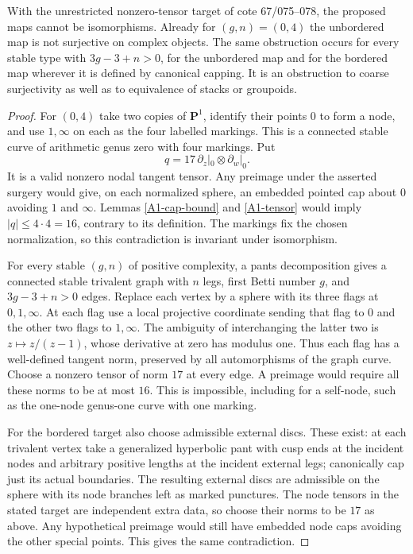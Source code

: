 \begin{theorem}\label{A1-global-refutation}
With the unrestricted nonzero-tensor target of cote 67/075--078, the proposed maps cannot be isomorphisms. Already for $(g,n)=(0,4)$ the unbordered map is not surjective on complex objects. The same obstruction occurs for every stable type with $3g-3+n>0$, for the unbordered map and for the bordered map wherever it is defined by canonical capping. It is an obstruction to coarse surjectivity as well as to equivalence of stacks or groupoids.
\end{theorem}
\begin{proof}
For $(0,4)$ take two copies of $\mathbf P^1$, identify their points $0$ to form a node, and use $1,\infty$ on each as the four labelled markings. This is a connected stable curve of arithmetic genus zero with four markings. Put
\[
q=17\,\partial_z|_0\otimes\partial_w|_0.
\]
It is a valid nonzero nodal tangent tensor. Any preimage under the asserted surgery would give, on each normalized sphere, an embedded pointed cap about $0$ avoiding $1$ and $\infty$. Lemmas \ref{A1-cap-bound} and \ref{A1-tensor} would imply $|q|\leq4\cdot4=16$, contrary to its definition. The markings fix the chosen normalization, so this contradiction is invariant under isomorphism.

For every stable $(g,n)$ of positive complexity, a pants decomposition gives a connected stable trivalent graph with $n$ legs, first Betti number $g$, and $3g-3+n>0$ edges. Replace each vertex by a sphere with its three flags at $0,1,\infty$. At each flag use a local projective coordinate sending that flag to $0$ and the other two flags to $1,\infty$. The ambiguity of interchanging the latter two is $z\mapsto z/(z-1)$, whose derivative at zero has modulus one. Thus each flag has a well-defined tangent norm, preserved by all automorphisms of the graph curve. Choose a nonzero tensor of norm $17$ at every edge. A preimage would require all these norms to be at most $16$. This is impossible, including for a self-node, such as the one-node genus-one curve with one marking.

For the bordered target also choose admissible external discs. These exist: at each trivalent vertex take a generalized hyperbolic pant with cusp ends at the incident nodes and arbitrary positive lengths at the incident external legs; canonically cap just its actual boundaries. The resulting external discs are admissible on the sphere with its node branches left as marked punctures. The node tensors in the stated target are independent extra data, so choose their norms to be $17$ as above. Any hypothetical preimage would still have embedded node caps avoiding the other special points. This gives the same contradiction.
\end{proof}


